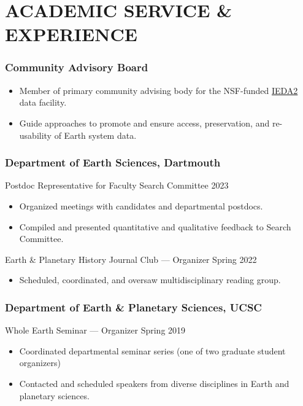 \section*{ACADEMIC SERVICE \& EXPERIENCE}

\subsubsection*{Community Advisory Board}
\begin{itemize}
\item Member of primary community advising body for the NSF-funded \href{https://www.iedadata.org/}{IEDA2} data facility.
\item Guide approaches to promote and ensure access, preservation, and re-usability of Earth system data.
\end{itemize}

\subsubsection*{Department of Earth Sciences, Dartmouth}
Postdoc Representative for Faculty Search Committee \hfill 2023
\begin{itemize}
	\item Organized meetings with candidates and departmental postdocs.
	\item Compiled and presented quantitative and qualitative feedback to Search Committee.
\end{itemize}\vspace*{1ex}

Earth \& Planetary History Journal Club --- Organizer 	 \hfill	Spring 2022
\begin{itemize}
	\item Scheduled, coordinated, and oversaw multidisciplinary reading group.
\end{itemize}

\subsubsection*{Department of Earth \& Planetary Sciences, UCSC}
Whole Earth Seminar --- Organizer \hfill  Spring 2019
\begin{itemize}
	\item Coordinated departmental seminar series (one of two graduate student organizers)
	\item Contacted and scheduled speakers from diverse disciplines in Earth and planetary sciences.
\end{itemize}

